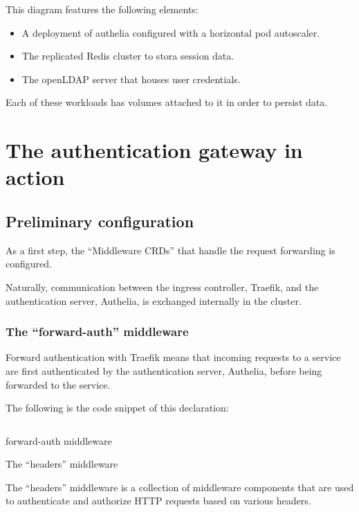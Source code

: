 This diagram features the following elements: 

\begin{itemize}[label={--}]
\item A deployment of authelia configured with a horizontal pod autoscaler.  
\item The replicated Redis cluster to stora session data. 
\item The openLDAP server that houses user credentials. 
\end{itemize}

Each of these workloads has volumes attached to it in order to persist data. 

\section{The authentication gateway in action }

\subsection{Preliminary configuration }

As a first step, the “Middleware CRDs” that handle the request forwarding is configured. 

Naturally, communication between the ingress controller, Traefik, and the authentication server, Authelia, is exchanged internally in the cluster. 

\subsubsection{The “forward-auth” middleware }

Forward authentication with Traefik means that incoming requests to a service are first authenticated by the authentication server, Authelia, before being forwarded to the service. 

The following is the code snippet of this declaration: 

\begin{listing}[H]
    \inputminted{Yaml}{codeListing/middleware_forward_auth.yml}
    \caption{forward-auth middleware}
    \label{lst:forward-auth middleware}
\end{listing}

The “headers” middleware 

The “headers” middleware is a collection of middleware components that are used to authenticate and authorize HTTP requests based on various headers.  

